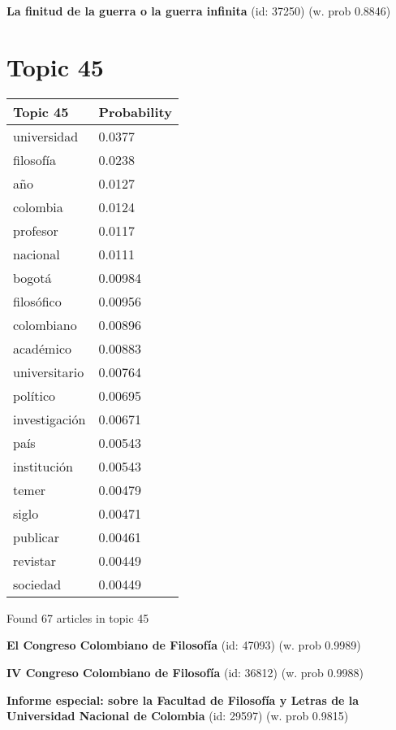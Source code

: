 \documentclass{article}
\begin{document}
\textbf{La finitud de la guerra o la guerra infinita} (id: 37250)
 (w. prob 0.8846)

\vfill
\newpage


\centering
\thispagestyle{empty}
\section*{Topic 45}\vfill
\begin{tabular}{ll}
\toprule
      Topic 45 & Probability \\
\midrule
   universidad &      0.0377 \\
     filosofía &      0.0238 \\
           año &      0.0127 \\
      colombia &      0.0124 \\
      profesor &      0.0117 \\
      nacional &      0.0111 \\
        bogotá &     0.00984 \\
    filosófico &     0.00956 \\
    colombiano &     0.00896 \\
     académico &     0.00883 \\
 universitario &     0.00764 \\
      político &     0.00695 \\
 investigación &     0.00671 \\
          país &     0.00543 \\
   institución &     0.00543 \\
         temer &     0.00479 \\
         siglo &     0.00471 \\
      publicar &     0.00461 \\
      revistar &     0.00449 \\
      sociedad &     0.00449 \\
\bottomrule
\end{tabular}

\vfill
Found 67 articles in topic 45
\vfill

\textbf{El Congreso Colombiano de Filosofía} (id: 47093)
 (w. prob 0.9989)
\vfill

\textbf{IV Congreso Colombiano de Filosofía} (id: 36812)
 (w. prob 0.9988)
\vfill

\textbf{Informe especial: sobre la Facultad de Filosofía y Letras de la Universidad Nacional de Colombia} (id: 29597)
 (w. prob 0.9815)
\end{document}
